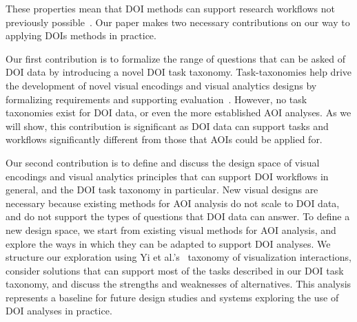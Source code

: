 These properties mean that DOI methods can support research workflows not previously possible~\cite{alam15analyzing, sundstedt2013visual, bernhard2014gaze}. Our paper makes two necessary contributions on our way to applying DOIs methods in practice.
 
Our first contribution is to formalize the range of questions that can be asked of DOI data by introducing a novel DOI task taxonomy. Task-taxonomies help drive the development of novel visual encodings and visual analytics designs by formalizing requirements and supporting evaluation~\cite{amar2005low,okoe2015graphunit}. However, no task taxonomies exist for DOI data, or even the more established AOI analyses. As we will show, this contribution is significant as DOI data can support tasks and workflows significantly different from those that AOIs could be applied for.

Our second contribution is to define and discuss the design space of visual encodings and visual analytics principles that can support DOI workflows in general, and the DOI task taxonomy in particular. New visual designs are necessary because existing methods for AOI analysis do not scale to DOI data, and do not support the types of questions that DOI data can answer. To define a new design space, we start from existing visual methods for AOI analysis, and explore the ways in which they can be adapted to support DOI analyses. We structure our exploration using Yi et al.'s~\cite{yi2007toward} taxonomy of visualization interactions, consider solutions that can support most of the tasks described in our DOI task taxonomy, and discuss the strengths and weaknesses of alternatives.  This analysis represents a baseline for future design studies and systems exploring the use of DOI analyses in practice.



